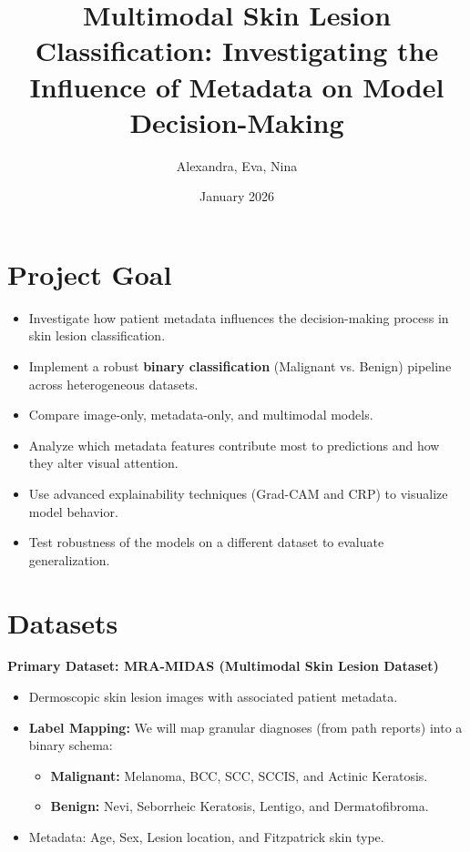 \documentclass[12pt]{extarticle}
\title{Multimodal Skin Lesion Classification: Investigating the Influence of Metadata on Model Decision-Making}
\author{Alexandra, Eva, Nina}
\date{January 2026}
\begin{document}
\maketitle

\section*{Project Goal}

\begin{itemize}
\item Investigate how patient metadata influences the decision-making process in skin lesion classification.
\item Implement a robust \textbf{binary classification} (Malignant vs. Benign) pipeline across heterogeneous datasets.
\item Compare image-only, metadata-only, and multimodal models.
\item Analyze which metadata features contribute most to predictions and how they alter visual attention.
\item Use advanced explainability techniques (Grad-CAM and CRP) to visualize model behavior.
\item Test robustness of the models on a different dataset to evaluate generalization.
\end{itemize}


\section*{Datasets}

\textbf{Primary Dataset: MRA-MIDAS (Multimodal Skin Lesion Dataset)\cite{mra_midas_dataset}}

\begin{itemize}
\item Dermoscopic skin lesion images with associated patient metadata.
\item \textbf{Label Mapping:} We will map granular diagnoses (from path reports) into a binary schema:
    \begin{itemize}
    \item \textbf{Malignant:} Melanoma, BCC, SCC, SCCIS, and Actinic Keratosis.
    \item \textbf{Benign:} Nevi, Seborrheic Keratosis, Lentigo, and Dermatofibroma.
    \end{itemize}
\item Metadata: Age, Sex, Lesion location, and Fitzpatrick skin type.
\end{itemize}
\end{document}
